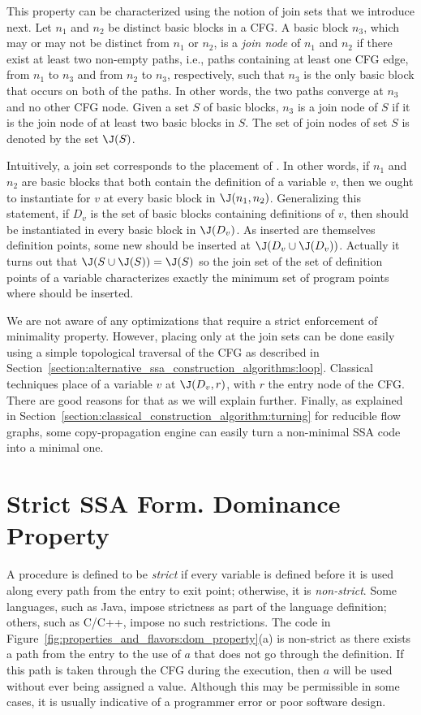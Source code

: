 This property can be characterized using the notion of join sets that we introduce next.
Let $n_{1}$ and $n_{2}$ be distinct basic blocks in a CFG. A basic block
$n_{3}$, which may or may not be distinct from $n_{1}$ or $n_{2}$, is 
a \emph{join node} of $n_{1}$ and $n_{2}$ if there exist at least two
non-empty paths, i.e., paths containing at least one CFG edge, from 
$n_{1}$ to $n_{3}$ and from $n_{2}$ to $n_{3}$, respectively, such that
$n_{3}$ is the only basic block that occurs on both of the paths. In
other words, the two paths converge at $n_{3}$ and no other CFG node. 
Given a set $S$ of basic blocks, $n_{3}$ is a join node of $S$ if it
is the join node of at least two basic blocks in $S$. The set of join
nodes of set $S$ is denoted by the set $\J(S)$. 

Intuitively, a join set corresponds to the placement of \phifuns.
In other words, if $n_{1}$ and $n_{2}$ are basic blocks that both
contain the definition of a variable $v$, then we ought to instantiate
\phifuns for $v$ at every basic block in $\J(n_{1}, n_{2})$. 
Generalizing this statement, if $D_v$ is the set of basic blocks containing
definitions of $v$, then \phifuns should be instantiated in
every basic block in $\J(D_v)$. As inserted \phifuns are themselves 
definition points, some new \phifuns should be inserted at $\J(D_v\cup\J(D_v))$. 
Actually it turns out that $\J(S\cup\J(S))=\J(S)$ so the join set of the set of definition points of a variable characterizes exactly the minimum set of program points where \phifuns should be inserted.

We are not aware of any optimizations that require a strict enforcement of minimality property.
However, placing \phifuns only at the join sets can be done easily using a simple topological traversal of the CFG as described in Section~\ref{section:alternative_ssa_construction_algorithms:loop}. Classical techniques place \phifuns of a variable $v$ at $\J(D_v,r)$, with $r$ the entry node of the CFG. There are good reasons for that as we will explain further. Finally, as explained in Section~\ref{section:classical_construction_algorithm:turning} for reducible flow graphs, some copy-propagation engine can easily turn a non-minimal SSA code into a minimal one.

\section{Strict SSA Form. Dominance Property}
\label{sec-prop-dominance}
A procedure is defined to be \emph{strict} if every variable
is defined before it is used along every path from the entry
to exit point; otherwise, it is \emph{non-strict}. 
Some languages, such as Java, impose strictness as part of the language
definition; others, such as C/C++, impose no such restrictions. 
The code in Figure~\ref{fig:properties_and_flavors:dom_property}(a) is non-strict as there exists a path from the entry to the use of $a$ that does not go through the definition. 
If this path is taken through the CFG during the execution, then $a$ will be used without ever
being assigned a value. Although this may be permissible in
some cases, it is usually indicative of a programmer error or poor software design. 

